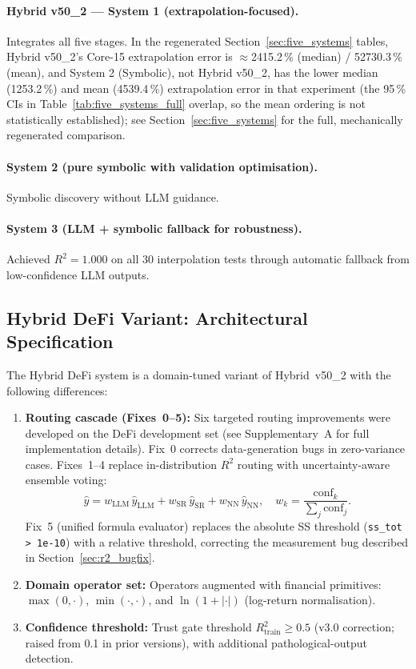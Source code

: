 \documentclass[twoside,11pt]{article}
\begin{document}
\paragraph{Hybrid v50\_2 --- System 1 (extrapolation-focused).}
Integrates all five stages. In the regenerated Section~\ref{sec:five_systems} tables, Hybrid v50\_2's Core-15 extrapolation error is $\approx$2415.2\,\%
(median) / 52730.3\,\% (mean), and System 2 (Symbolic), not Hybrid v50\_2,
has the lower median (1253.2\,\%) and mean (4539.4\,\%) extrapolation error in that
experiment (the 95\,\% CIs in
Table~\ref{tab:five_systems_full} overlap, so the mean ordering is not
statistically established); see
Section~\ref{sec:five_systems} for the full, mechanically regenerated
comparison.

\paragraph{System 2 (pure symbolic with validation optimisation).}
Symbolic discovery without LLM guidance.

\paragraph{System 3 (LLM + symbolic fallback for robustness).}
Achieved $R^2 = 1.000$ on all 30 interpolation tests through automatic
fallback from low-confidence LLM outputs.

\subsection{Hybrid DeFi Variant: Architectural Specification}\label{subsec:hybrid-defi-variant-architectural-specif}
\label{sec:hybrid_defi_spec}

The Hybrid DeFi system is a domain-tuned variant of Hybrid~v50\_2 with the
following differences:

\begin{enumerate}
\item \textbf{Routing cascade (Fixes~0--5):} Six targeted routing improvements
  were developed on the DeFi development set (see Supplementary~A for full
  implementation details).  Fix~0 corrects data-generation bugs in zero-variance
  cases.  Fixes~1--4 replace in-distribution $R^2$ routing with uncertainty-aware
  ensemble voting:
  \[
    \hat{y} = w_\mathrm{LLM}\,\hat{y}_\mathrm{LLM}
             + w_\mathrm{SR}\,\hat{y}_\mathrm{SR}
             + w_\mathrm{NN}\,\hat{y}_\mathrm{NN},
    \quad w_k = \frac{\mathrm{conf}_k}{\sum_j \mathrm{conf}_j}.
  \]
  Fix~5 (unified formula evaluator) replaces the absolute SS threshold
  (\texttt{ss\_tot > 1e-10}) with a relative threshold, correcting the
  measurement bug described in Section~\ref{sec:r2_bugfix}.
\item \textbf{Domain operator set:} Operators augmented with financial
  primitives: $\max(0,\cdot)$, $\min(\cdot,\cdot)$, and
  $\ln(1+|\cdot|)$ (log-return normalisation).
\item \textbf{Confidence threshold:} Trust gate threshold $R^2_{\mathrm{train}} \geq 0.5$
  (v3.0 correction; raised from 0.1 in prior versions), with additional
  pathological-output detection.
\end{enumerate}
\end{document}
